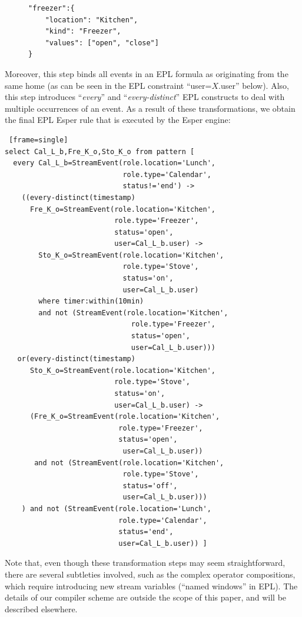 \begin{figure}[h]
\begin{footnotesize}
\begin{Verbatim}
"freezer":{
	"location": "Kitchen",
	"kind": "Freezer",
	"values": ["open", "close"]
}
\end{Verbatim}
\end{footnotesize}
\end{figure}

Moreover, this step binds all events in an EPL formula as originating from the same home (as can be seen in the EPL constraint ``{\ttfamily user=$X$.user}'' below).  Also, this step introduces ``{\em every}'' and ``{\em every-distinct}'' EPL constructs to deal with multiple occurrences of an event. As a result of these transformations, we obtain the final EPL Esper rule that is executed by the Esper engine:

\begin{footnotesize}
\begin{lstlisting} [frame=single]
select Cal_L_b,Fre_K_o,Sto_K_o from pattern [ 
  every Cal_L_b=StreamEvent(role.location='Lunch',
                            role.type='Calendar',
                            status!='end') -> 
    ((every-distinct(timestamp)
      Fre_K_o=StreamEvent(role.location='Kitchen',
                          role.type='Freezer',
                          status='open',
                          user=Cal_L_b.user) -> 
        Sto_K_o=StreamEvent(role.location='Kitchen',
                            role.type='Stove',
                            status='on',
                            user=Cal_L_b.user) 
        where timer:within(10min)
        and not (StreamEvent(role.location='Kitchen',
                              role.type='Freezer',
                              status='open',
                              user=Cal_L_b.user))) 
   or(every-distinct(timestamp)
      Sto_K_o=StreamEvent(role.location='Kitchen',
                          role.type='Stove',
                          status='on',
                          user=Cal_L_b.user) -> 
      (Fre_K_o=StreamEvent(role.location='Kitchen',
                           role.type='Freezer',
                           status='open',
                            user=Cal_L_b.user)) 
       and not (StreamEvent(role.location='Kitchen',
                            role.type='Stove',
                            status='off',
                            user=Cal_L_b.user))) 
    ) and not (StreamEvent(role.location='Lunch',
                           role.type='Calendar',
                           status='end',
                           user=Cal_L_b.user)) ]
\end{lstlisting}
\end{footnotesize}

Note that, even though these transformation steps may seem straightforward, there are several subtleties involved, such as the complex operator compositions, which require introducing new stream variables (``named windows'' in EPL). The details of our compiler scheme are outside the scope of this paper, and will be described elsewhere.
